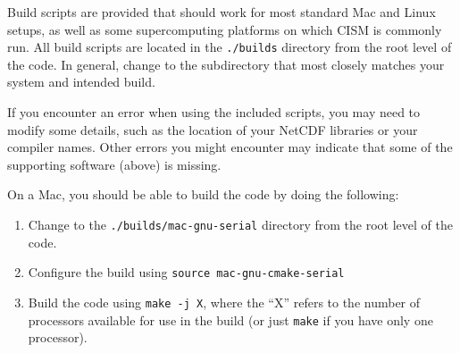 Build scripts are provided that should work for most standard Mac and Linux setups, 
as well as some supercomputing platforms on which CISM is commonly run.
All build scripts are located in the \texttt{./builds} directory from the root level of the code.
In general, change to the subdirectory that most closely matches your system and intended
build.

If you encounter an error when using the included scripts, you may need to modify some details, 
such as the location of your NetCDF libraries or your compiler names.  Other errors you might 
encounter may indicate that some of the supporting software (above) is missing.


\begin{mdframed}[style=mac] %
On a Mac, you should be able to build the code by doing the following:

\begin{enumerate}
\item{Change to the \texttt{./builds/mac-gnu-serial} directory from the root level of the code.}
\item{Configure the build using \texttt{source mac-gnu-cmake-serial}}
\item{Build the code using \texttt{make -j X}, where the ``X'' refers to the number of processors available for use in the build (or just \texttt{make} if you have only one processor).}
\end{enumerate}
\end{mdframed}              %


